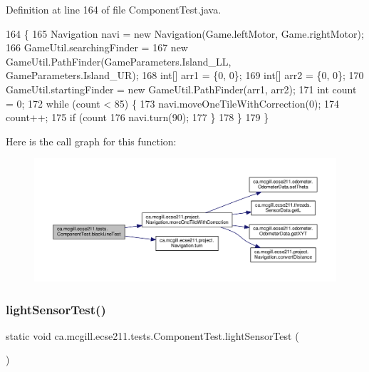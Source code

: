 Definition at line 164 of file Component\+Test.\+java.


\begin{DoxyCode}
164                                                                \{
165     Navigation navi = \textcolor{keyword}{new} Navigation(Game.leftMotor, Game.rightMotor);
166     GameUtil.searchingFinder =
167         \textcolor{keyword}{new} GameUtil.PathFinder(GameParameters.Island\_LL, GameParameters.Island\_UR);
168     \textcolor{keywordtype}{int}[] arr1 = \{0, 0\};
169     \textcolor{keywordtype}{int}[] arr2 = \{0, 0\};
170     GameUtil.startingFinder = \textcolor{keyword}{new} GameUtil.PathFinder(arr1, arr2);
171     \textcolor{keywordtype}{int} count = 0;
172     \textcolor{keywordflow}{while} (count < 85) \{
173       navi.moveOneTileWithCorrection(0);
174       count++;
175       \textcolor{keywordflow}{if} (count %
176         navi.turn(90);
177       \}
178     \}
179   \}
\end{DoxyCode}
Here is the call graph for this function\+:\nopagebreak
\begin{figure}[H]
\begin{center}
\leavevmode
\includegraphics[width=350pt]{enumca_1_1mcgill_1_1ecse211_1_1tests_1_1_component_test_a3f36cee9ca567c845377bec33554ba8b_cgraph}
\end{center}
\end{figure}
\mbox{\label{enumca_1_1mcgill_1_1ecse211_1_1tests_1_1_component_test_a3e8288f482b3806a0f3c4668951f3e36}} 
\subsubsection{\texorpdfstring{light\+Sensor\+Test()}{lightSensorTest()}}
{\footnotesize\ttfamily static void ca.\+mcgill.\+ecse211.\+tests.\+Component\+Test.\+light\+Sensor\+Test (\begin{DoxyParamCaption}{ }\end{DoxyParamCaption})\hspace{0.3cm}{\ttfamily [static]}}

